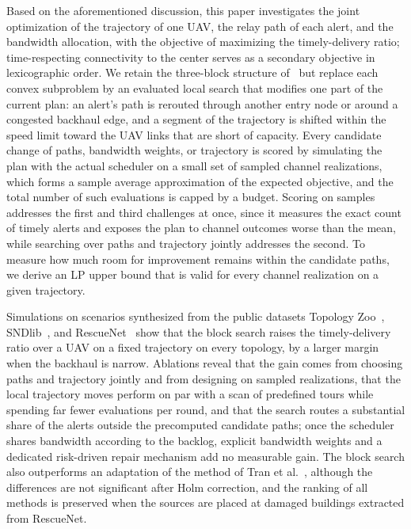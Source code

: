 Based on the aforementioned discussion, this paper investigates the joint optimization of the trajectory of one UAV, the relay path of each alert, and the bandwidth allocation, with the objective of maximizing the timely-delivery ratio; time-respecting connectivity to the center serves as a secondary objective in lexicographic order. We retain the three-block structure of~\cite{huang2025ddatsap} but replace each convex subproblem by an evaluated local search that modifies one part of the current plan: an alert's path is rerouted through another entry node or around a congested backhaul edge, and a segment of the trajectory is shifted within the speed limit toward the UAV links that are short of capacity. Every candidate change of paths, bandwidth weights, or trajectory is scored by simulating the plan with the actual scheduler on a small set of sampled channel realizations, which forms a sample average approximation of the expected objective, and the total number of such evaluations is capped by a budget. Scoring on samples addresses the first and third challenges at once, since it measures the exact count of timely alerts and exposes the plan to channel outcomes worse than the mean, while searching over paths and trajectory jointly addresses the second. To measure how much room for improvement remains within the candidate paths, we derive an LP upper bound that is valid for every channel realization on a given trajectory.

Simulations on scenarios synthesized from the public datasets Topology Zoo~\cite{knight2011zoo}, SNDlib~\cite{orlowski2010sndlib}, and RescueNet~\cite{rahnemoonfar2023rescuenet} show that the block search raises the timely-delivery ratio over a UAV on a fixed trajectory on every topology, by a larger margin when the backhaul is narrow. Ablations reveal that the gain comes from choosing paths and trajectory jointly and from designing on sampled realizations, that the local trajectory moves perform on par with a scan of predefined tours while spending far fewer evaluations per round, and that the search routes a substantial share of the alerts outside the precomputed candidate paths; once the scheduler shares bandwidth according to the backlog, explicit bandwidth weights and a dedicated risk-driven repair mechanism add no measurable gain. The block search also outperforms an adaptation of the method of Tran et al.~\cite{tran2022relay}, although the differences are not significant after Holm correction, and the ranking of all methods is preserved when the sources are placed at damaged buildings extracted from RescueNet.

